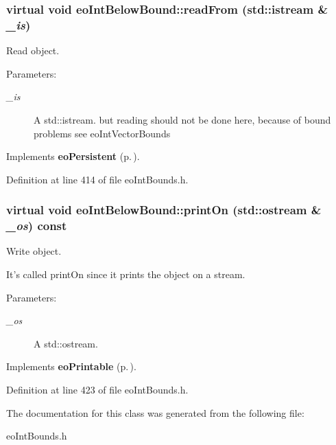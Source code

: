 \subsubsection{\setlength{\rightskip}{0pt plus 5cm}virtual void eo\-Int\-Below\-Bound::read\-From (std::istream \& {\em \_\-is})\hspace{0.3cm}{\tt  [inline, virtual]}}\label{classeo_int_below_bound_a14}


Read object. 

\begin{Desc}
\item[Parameters:]
\begin{description}
\item[{\em \_\-is}]A std::istream. but reading should not be done here, because of bound problems see eo\-Int\-Vector\-Bounds \end{description}
\end{Desc}


Implements {\bf eo\-Persistent} {\rm (p.\,\pageref{classeo_persistent_a1})}.

Definition at line 414 of file eo\-Int\-Bounds.h.
\subsubsection{\setlength{\rightskip}{0pt plus 5cm}virtual void eo\-Int\-Below\-Bound::print\-On (std::ostream \& {\em \_\-os}) const\hspace{0.3cm}{\tt  [inline, virtual]}}\label{classeo_int_below_bound_a15}


Write object. 

It's called print\-On since it prints the object on a stream. \begin{Desc}
\item[Parameters:]
\begin{description}
\item[{\em \_\-os}]A std::ostream. \end{description}
\end{Desc}


Implements {\bf eo\-Printable} {\rm (p.\,\pageref{classeo_printable_a1})}.

Definition at line 423 of file eo\-Int\-Bounds.h.

The documentation for this class was generated from the following file:\begin{CompactItemize}
\item 
eo\-Int\-Bounds.h\end{CompactItemize}
